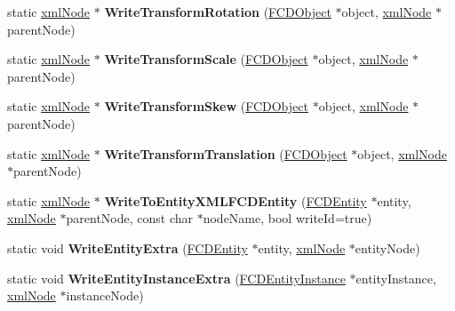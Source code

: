 \begin{DoxyCompactItemize}
\item 
\hypertarget{classFArchiveXML_aea7100c70dad99ff2ac5ad6e067de117}{
static \hyperlink{struct__xmlNode}{xmlNode} $\ast$ {\bfseries WriteTransformRotation} (\hyperlink{classFCDObject}{FCDObject} $\ast$object, \hyperlink{struct__xmlNode}{xmlNode} $\ast$parentNode)}
\label{classFArchiveXML_aea7100c70dad99ff2ac5ad6e067de117}

\item 
\hypertarget{classFArchiveXML_a63daeab153e77ba51ec8572490c90931}{
static \hyperlink{struct__xmlNode}{xmlNode} $\ast$ {\bfseries WriteTransformScale} (\hyperlink{classFCDObject}{FCDObject} $\ast$object, \hyperlink{struct__xmlNode}{xmlNode} $\ast$parentNode)}
\label{classFArchiveXML_a63daeab153e77ba51ec8572490c90931}

\item 
\hypertarget{classFArchiveXML_add94c40762481e636b6f5db574d30578}{
static \hyperlink{struct__xmlNode}{xmlNode} $\ast$ {\bfseries WriteTransformSkew} (\hyperlink{classFCDObject}{FCDObject} $\ast$object, \hyperlink{struct__xmlNode}{xmlNode} $\ast$parentNode)}
\label{classFArchiveXML_add94c40762481e636b6f5db574d30578}

\item 
\hypertarget{classFArchiveXML_acb9a7d6c0bd6c96f5f36591991638375}{
static \hyperlink{struct__xmlNode}{xmlNode} $\ast$ {\bfseries WriteTransformTranslation} (\hyperlink{classFCDObject}{FCDObject} $\ast$object, \hyperlink{struct__xmlNode}{xmlNode} $\ast$parentNode)}
\label{classFArchiveXML_acb9a7d6c0bd6c96f5f36591991638375}

\item 
\hypertarget{classFArchiveXML_a90a5b09426c94ede663cf714988fd37b}{
static \hyperlink{struct__xmlNode}{xmlNode} $\ast$ {\bfseries WriteToEntityXMLFCDEntity} (\hyperlink{classFCDEntity}{FCDEntity} $\ast$entity, \hyperlink{struct__xmlNode}{xmlNode} $\ast$parentNode, const char $\ast$nodeName, bool writeId=true)}
\label{classFArchiveXML_a90a5b09426c94ede663cf714988fd37b}

\item 
\hypertarget{classFArchiveXML_ac9d27deb3f41a681b21a3319939162ed}{
static void {\bfseries WriteEntityExtra} (\hyperlink{classFCDEntity}{FCDEntity} $\ast$entity, \hyperlink{struct__xmlNode}{xmlNode} $\ast$entityNode)}
\label{classFArchiveXML_ac9d27deb3f41a681b21a3319939162ed}

\item 
\hypertarget{classFArchiveXML_a3823567796ad14b199aa0823a6c6c7df}{
static void {\bfseries WriteEntityInstanceExtra} (\hyperlink{classFCDEntityInstance}{FCDEntityInstance} $\ast$entityInstance, \hyperlink{struct__xmlNode}{xmlNode} $\ast$instanceNode)}
\label{classFArchiveXML_a3823567796ad14b199aa0823a6c6c7df}


\end{DoxyCompactItemize}
